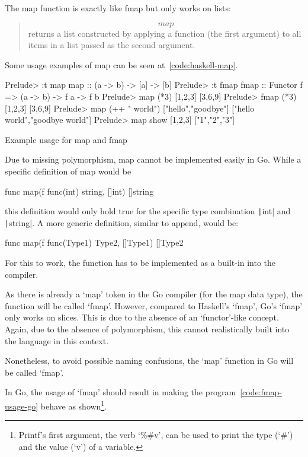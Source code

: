 The map function is exactly like fmap but only works on lists:

\begin{quote}
    \[map\] returns a list constructed by applying a function (the first argument) to all
    items in a list passed as the second argument\autocite{haskell-map}.
\end{quote}

Some usage examples of map can be seen at~\ref{code:haskell-map}.

\begin{listing}
    \begin{haskellcode}
Prelude> :t map
map :: (a -> b) -> [a] -> [b]
Prelude> :t fmap
fmap :: Functor f => (a -> b) -> f a -> f b
Prelude> map (*3) [1,2,3]
[3,6,9]
Prelude> fmap (*3) [1,2,3]
[3,6,9]
Prelude> map (++ " world") ["hello","goodbye"]
["hello world","goodbye world"]
Prelude> map show [1,2,3]
["1","2","3"]
    \end{haskellcode}
    \caption{Example usage for map and fmap}\label{code:haskell-map}
\end{listing}
Due to missing polymorphism, map cannot be implemented easily in Go. While
a specific definition of map would be
\begin{gocode}
func map(f func(int) string, []int) []string
\end{gocode}
this definition would only hold true for the specific type combination \texttt|int|
and \texttt|string|. A more generic definition, similar to append,
would be:
\begin{gocode}
func map(f func(Type1) Type2, []Type1) []Type2
\end{gocode}
For this to work, the function has to be implemented as a built-in into the compiler.

As there is already a `map' token in the Go compiler (for the map data type),
the function will be called `fmap'. However, compared to Haskell's `fmap',
Go's `fmap' only works on slices. This is due
to the absence of an `functor'-like concept. Again, due to the absence of polymorphism,
this cannot realistically built into the language in this context.

Nonetheless, to avoid possible naming confusions, the `map' function in Go will
be called `fmap'.

In Go, the usage of `fmap' should result in making the program~\ref{code:fmap-usage-go}
behave as shown\footnote{Printf's first argument, the
verb `\%\#v', can be used to print the type (`\#') and the value (`v') of a
variable\autocite{fmt-godoc}.}.

